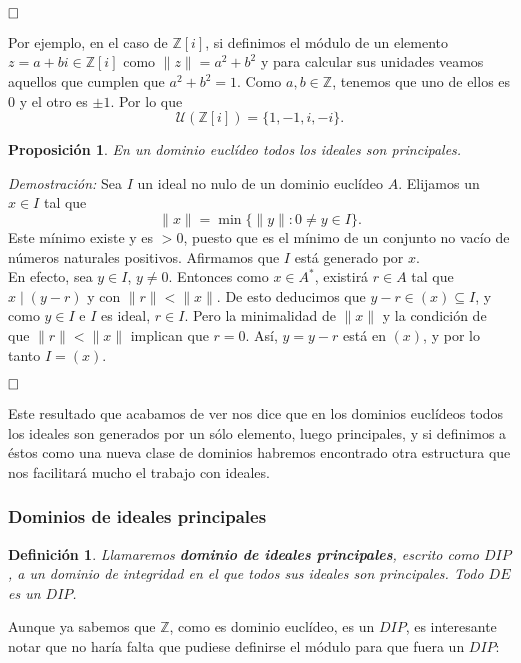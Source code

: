 \documentclass[12pt]{article}
\newtheorem{proposition}[theorem]{Proposición}
\newtheorem{definition}[theorem]{Definición}
\providecommand{\norm}[1]{\lVert#1\rVert}
\begin{document}
$\hfill \square$

Por ejemplo, en el caso de $\mathbb{Z}[i]$, si definimos el módulo de un elemento $z = a+bi \in \mathbb{Z}[i]$ como $\norm{z} = a^{2} + b^{2}$ y para calcular sus unidades veamos aquellos que cumplen que $a^{2} + b^{2} = 1$. Como $a,b \in \mathbb{Z}$, tenemos que uno de ellos es $0$ y el otro es $\pm 1$. Por lo que $$\mathcal{U}(\mathbb{Z}[i]) = \lbrace 1, -1, i, -i \rbrace.$$

\begin{proposition}\label{eq:dedip} En un dominio euclídeo todos los ideales son principales.
\end{proposition}
\emph{Demostración: } Sea $I$ un ideal no nulo de un dominio euclídeo $A$. Elijamos un $x \in I$ tal que $$\norm{x} = \min \lbrace \norm{y} :0 \neq y \in I \rbrace.$$ Este mínimo existe y es $>0$, puesto que es el mínimo de un conjunto no vacío de números naturales positivos. Afirmamos que $I$ está generado por $x$.\vspace{0.2cm}\\
En efecto, sea $y \in I$, $y \neq 0$. Entonces como $x \in A^{\ast}$, existirá $r \in A$ tal que $x \mid (y-r)$ y con $\norm{r} < \norm{x}$. De esto deducimos que $y-r \in (x) \subseteq I$, y como $y \in I$ e $I$ es ideal, $r \in I$. Pero la minimalidad de $\norm{x}$ y la condición de que $\norm{r} < \norm{x}$ implican que $r = 0$. Así, $y = y-r$ está en $(x)$, y por lo tanto $I = (x)$.

$\hfill \square$

Este resultado que acabamos de ver nos dice que en los dominios euclídeos todos los ideales son generados por un sólo elemento, luego principales, y si definimos a éstos como una nueva clase de dominios habremos encontrado otra estructura que nos facilitará mucho el trabajo con ideales. 

\subsubsection{Dominios de ideales principales}

\begin{definition} Llamaremos \textbf{dominio de ideales principales}, escrito como $DIP$, a un dominio de integridad en el que todos sus ideales son principales. Todo $DE$ es un $DIP$.
\end{definition} 

Aunque ya sabemos que $\mathbb{Z}$, como es dominio euclídeo, es un $DIP$, es interesante notar que no haría falta que pudiese definirse el módulo para que fuera un $DIP$:
\end{document}
